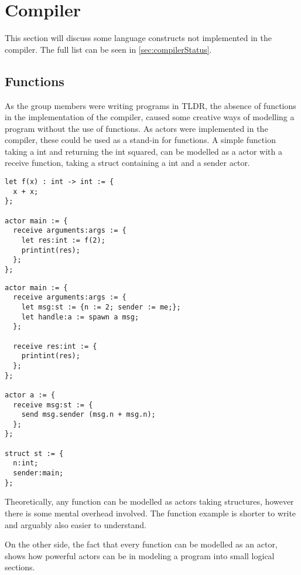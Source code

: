 \section{Compiler}

This section will discuss some language constructs not implemented in the compiler. The full list can be seen in \cref{sec:compilerStatus}.

\subsection{Functions}\label{dis:func}

As the group members were writing programs in TLDR, the absence of functions in the implementation of the compiler, caused some creative ways of modelling a program without the use of functions. As actors were implemented in the compiler, these could be used as a stand-in for functions. A simple function taking a int and returning the int squared, can be modelled as a actor with a receive function, taking a struct containing a int and a sender actor. 

\begin{lstlisting}[style=TLDR, caption = {Simple example using a function.}]
let f(x) : int -> int := {
  x + x;
};

actor main := {
  receive arguments:args := {
    let res:int := f(2);
    printint(res);
  };
};
\end{lstlisting}
\begin{lstlisting}[style=TLDR, caption = {Example of modeling a function taking a int and returning the int squared, as an actor.}]
actor main := {
  receive arguments:args := {
    let msg:st := {n := 2; sender := me;};
    let handle:a := spawn a msg;
  };
  
  receive res:int := {
    printint(res);
  };
};

actor a := {
  receive msg:st := {
    send msg.sender (msg.n + msg.n);
  };
};

struct st := {
  n:int;
  sender:main;
};
\end{lstlisting}

Theoretically, any function can be modelled as actors taking structures, however there is some mental overhead involved. The function example is shorter to write and arguably also easier to understand.

On the other side, the fact that every function can be modelled as an actor, shows how powerful actors can be in modeling a program into small logical sections.

